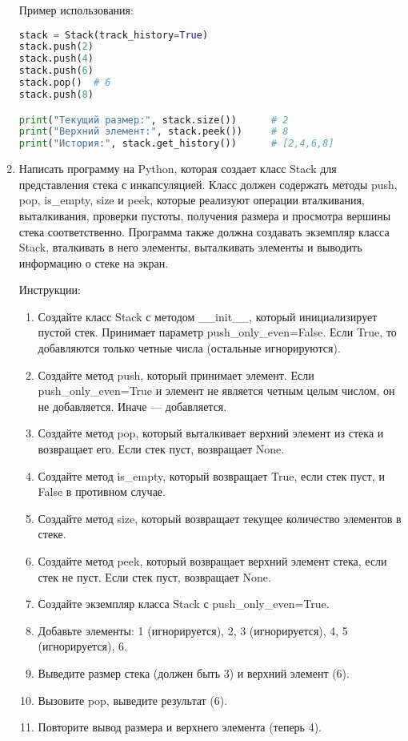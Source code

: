 \begin{enumerate}
Пример использования:
\begin{lstlisting}[language=Python]
stack = Stack(track_history=True)
stack.push(2)
stack.push(4)
stack.push(6)
stack.pop()  # 6
stack.push(8)

print("Текущий размер:", stack.size())      # 2
print("Верхний элемент:", stack.peek())     # 8
print("История:", stack.get_history())      # [2,4,6,8]
\end{lstlisting}

\item Написать программу на Python, которая создает класс Stack для представления стека с инкапсуляцией. Класс должен содержать методы push, pop, is\_empty, size и peek, которые реализуют операции вталкивания, выталкивания, проверки пустоты, получения размера и просмотра вершины стека соответственно. Программа также должна создавать экземпляр класса Stack, вталкивать в него элементы, выталкивать элементы и выводить информацию о стеке на экран.

Инструкции:
\begin{enumerate}
    \item Создайте класс Stack с методом \_\_init\_\_, который инициализирует пустой стек. Принимает параметр push\_only\_even=False. Если True, то добавляются только четные числа (остальные игнорируются).
    \item Создайте метод push, который принимает элемент. Если push\_only\_even=True и элемент не является четным целым числом, он не добавляется. Иначе — добавляется.
    \item Создайте метод pop, который выталкивает верхний элемент из стека и возвращает его. Если стек пуст, возвращает None.
    \item Создайте метод is\_empty, который возвращает True, если стек пуст, и False в противном случае.
    \item Создайте метод size, который возвращает текущее количество элементов в стеке.
    \item Создайте метод peek, который возвращает верхний элемент стека, если стек не пуст. Если стек пуст, возвращает None.
    \item Создайте экземпляр класса Stack с push\_only\_even=True.
    \item Добавьте элементы: 1 (игнорируется), 2, 3 (игнорируется), 4, 5 (игнорируется), 6.
    \item Выведите размер стека (должен быть 3) и верхний элемент (6).
    \item Вызовите pop, выведите результат (6).
    \item Повторите вывод размера и верхнего элемента (теперь 4).
\end{enumerate}


\end{enumerate}
